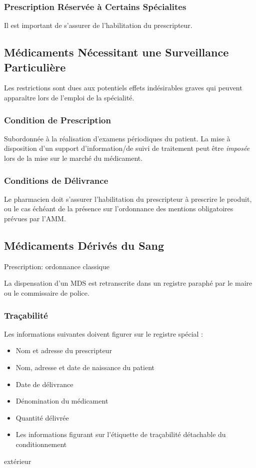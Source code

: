 \documentclass[11pt]{article}
\begin{document}
\subsubsection{Prescription Réservée à Certains Spécialites}
\label{sec:org5c6f2b8}
Il est important de s'assurer de l'habilitation du prescripteur.

\subsection{Médicaments Nécessitant une Surveillance Particulière}
\label{sec:orgd833136}
Les restrictions sont dues aux potentiels effets indésirables graves qui peuvent apparaître lors de l'emploi de la spécialité.

\subsubsection{Condition de Prescription}
\label{sec:org0f4f382}
Subordonnée à la réalisation d'examens périodiques du patient.
La mise à disposition d'un support d'information/de suivi de traitement peut être \emph{imposée} lors de la mise sur le marché du médicament.

\subsubsection{Conditions de Délivrance}
\label{sec:org7b3042f}
Le pharmacien doit s'assurer l'habilitation du prescripteur à prescrire le produit, ou le cas échéant de la présence sur l'ordonnance des mentions obligatoires prévues par l'AMM.

\subsection{Médicaments Dérivés du Sang}
\label{sec:orge8be56c}
Prescription: ordonnance classique

La dispensation d'un MDS est retranscrite dans un registre paraphé par le maire ou le commissaire de police.

\subsubsection{Traçabilité}
\label{sec:orge41dc86}
Les informations suivantes doivent figurer sur le registre spécial :
\begin{itemize}
\item Nom et adresse du prescripteur
\item Nom, adresse et date de naissance du patient
\item Date de délivrance
\item Dénomination du médicament
\item Quantité délivrée
\item Les informations figurant sur l'étiquette de traçabilité détachable du conditionnement
\end{itemize}
extérieur
\end{document}

